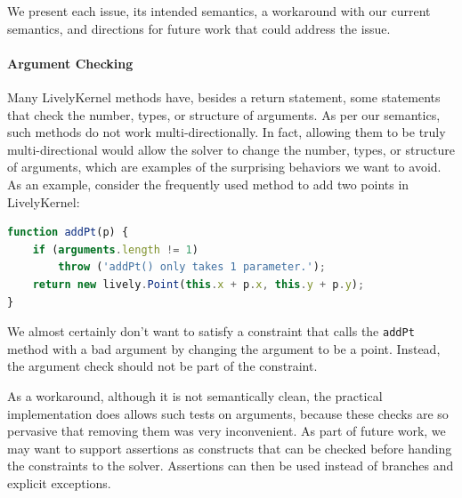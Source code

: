 \documentclass[10pt,reprint]{sigplanconf-preprint}
\begin{document}
We present each issue, its intended semantics, a workaround with our
current semantics, and directions for future work that could address
the issue.

\paragraph{Argument Checking }
\label{sec:argument-checking}
Many LivelyKernel methods have, besides a return statement, some
statements that check the number, types, or structure of arguments. As
per our semantics, such methods do not work multi-directionally. In
fact, allowing them to be truly multi-directional would allow the
solver to change the number, types, or structure of arguments, which
are examples of the surprising behaviors we want to avoid. As an
example, consider the frequently used method to add two points in
LivelyKernel:
\begin{lstlisting}[language=JavaScript,caption={~},label=lst:addPt]
function addPt(p) {
    if (arguments.length != 1)
        throw ('addPt() only takes 1 parameter.');
    return new lively.Point(this.x + p.x, this.y + p.y);
}
\end{lstlisting}
We almost certainly don't want to satisfy a constraint that calls the
\verb|addPt| method with a bad argument by changing the argument to be
a point. Instead, the argument check should not be part of the
constraint.

As a workaround, although it is not semantically clean, the practical
implementation does allows such tests on arguments, because these checks
are so pervasive that removing them was very inconvenient. As part of
future work, we may want to support assertions as constructs that can be
checked before handing the constraints to the solver. Assertions can
then be used instead of branches and explicit exceptions.
\end{document}
